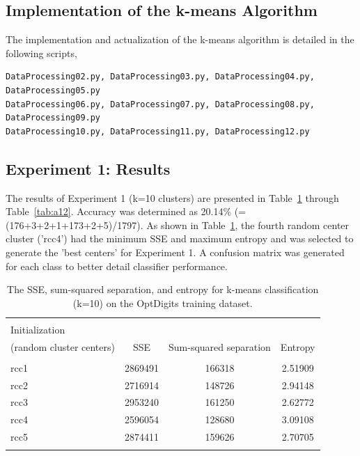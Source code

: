 \documentclass[12pt]{article}
\begin{document}
\subsection{Implementation of the k-means Algorithm} 
The implementation and actualization of the k-means algorithm is detailed in the following scripts,
\begin{verbatim}
DataProcessing02.py, DataProcessing03.py, DataProcessing04.py, DataProcessing05.py
DataProcessing06.py, DataProcessing07.py, DataProcessing08.py, DataProcessing09.py
DataProcessing10.py, DataProcessing11.py, DataProcessing12.py
\end{verbatim}


\subsection{Experiment 1: Results}
The results of Experiment 1 (k=10 clusters) are presented in Table~\ref{tab:a1} through Table~\ref{tab:a12}. Accuracy was determined as 20.14\% (=(176+3+2+1+173+2+5)/1797). As shown in Table~\ref{tab:a1}, the fourth random center cluster ('rcc4') had the minimum SSE and maximum entropy and was selected to generate the 'best centers' for Experiment 1. A confusion matrix was generated for each class to better detail classifier performance.

\begin{table} \centering 
  \caption{The SSE, sum-squared separation, and entropy for k-means classification (k=10) on the OptDigits training dataset.} 
  \label{tab:a1} 
\begin{tabular}{lccc} \\
[-1.8ex] \hline \hline \\[-1.8ex] 
 Initialization &&& \\ 
 (random cluster centers) & SSE & Sum-squared separation & Entropy\\
\hline \\[-1.8ex]
rcc1 & 2869491 & 166318 & 2.51909\\
rcc2 & 2716914 & 148726 & 2.94148\\
rcc3 & 2953240 & 161250 & 2.62772\\
rcc4 & 2596054 & 128680 & 3.09108\\
rcc5 & 2874411 & 159626 & 2.70705\\
\hline \\[-1.8ex]
\end{tabular} 
\end{table}
\end{document}
